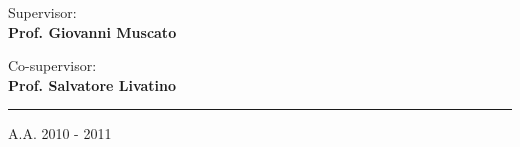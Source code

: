 \begin{titlepage}
\begin{flushright}
  \vfill
  \textsf{Supervisor:} \\
  \textsf{\textbf{Prof. Giovanni Muscato}} \\                      
  \vspace{0.5 truecm}
  
  \textsf{Co-supervisor:} \\
  \textsf{\textbf{Prof. Salvatore Livatino }}
\end{flushright}

\rule{\linewidth}{1pt}
\begin{center}

A.A. 2010 - 2011
\end{center}


\end{titlepage}
